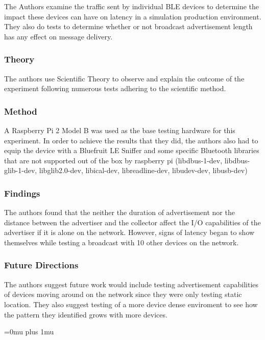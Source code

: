 \noindent
The Authors examine the traffic sent by individual BLE devices to determine the impact these devices can have on latency in a simulation production environment. They also do tests to determine whether or not broadcast advertisement length has any effect on message delivery.

\subsubsection{Theory}

\noindent
The authors use Scientific Theory to observe and explain the outcome of the experiment following numerous tests adhering to the scientific method.

\subsubsection{Method}

\noindent
A Raspberry Pi 2 Model B was used as the base testing hardware for this experiment. In order to achieve the results that they did, the authors also had to equip the device with a Bluefruit LE Sniffer and some specific Bluetooth libraries that are not supported out of the box by raspberry pi (libdbus-1-dev,  libdbus-glib-1-dev,  libglib2.0-dev,  libical-dev, libreadline-dev, libudev-dev, libusb-dev)

\subsubsection{Findings}

\noindent
The authors found that the neither the duration of advertisement nor the distance between the advertiser and the collector affect the I/O capabilities of the advertiser if it is alone on the network. However, signs of latency began to show themselves while testing a broadcast with 10 other devices on the network.

\subsubsection{Future Directions}

\noindent
The authors suggest future work would include testing advertisement capabilities of devices moving around on the network since they were only testing static location. They also suggest testing of a more device dense enviroment to see how the pattern they identified grows with more devices.

\Urlmuskip=0mu plus 1mu\relax

